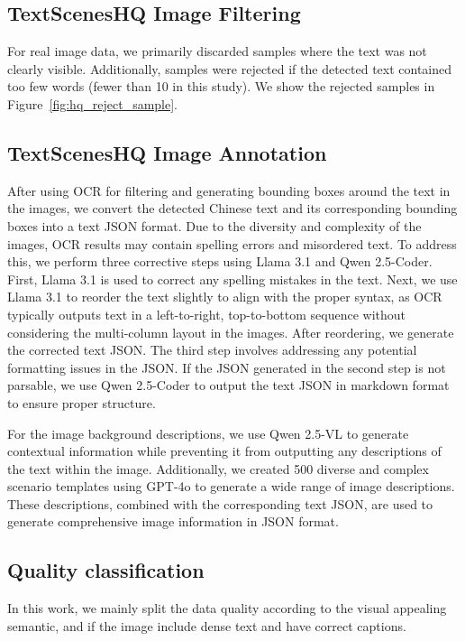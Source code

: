 \subsection{TextScenesHQ Image Filtering}
For real image data, we primarily discarded samples where the text was not clearly visible. 
Additionally, samples were rejected if the detected text contained too few words (fewer than 10 in this study).
We show the rejected samples in Figure~\ref{fig:hq_reject_sample}.




\subsection{TextScenesHQ Image Annotation}
\label{sec:appendix_textsceneshq_annotation}
After using OCR for filtering and generating bounding boxes around the text in the images, we convert the detected Chinese text and its corresponding bounding boxes into a text JSON format. Due to the diversity and complexity of the images, OCR results may contain spelling errors and misordered text. To address this, we perform three corrective steps using Llama 3.1 and Qwen 2.5-Coder. First, Llama 3.1 is used to correct any spelling mistakes in the text. Next, we use Llama 3.1 to reorder the text slightly to align with the proper syntax, as OCR typically outputs text in a left-to-right, top-to-bottom sequence without considering the multi-column layout in the images. After reordering, we generate the corrected text JSON. The third step involves addressing any potential formatting issues in the JSON. If the JSON generated in the second step is not parsable, we use Qwen 2.5-Coder to output the text JSON in markdown format to ensure proper structure.

For the image background descriptions, we use Qwen 2.5-VL to generate contextual information while preventing it from outputting any descriptions of the text within the image. Additionally, we created 500 diverse and complex scenario templates using GPT-4o to generate a wide range of image descriptions. These descriptions, combined with the corresponding text JSON, are used to generate comprehensive image information in JSON format.


\subsection{Quality classification}
In this work, we mainly split the data quality according to the visual appealing semantic, and if the image include dense text and have correct captions.

